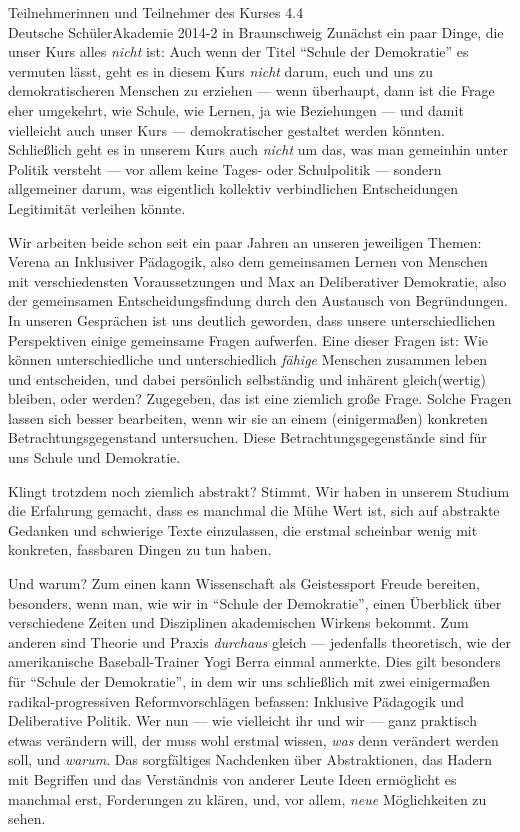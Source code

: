 \documentclass[a4paper]{letter}
\begin{document}
\begin{letter}{
	Teilnehmerinnen und Teilnehmer des Kurses 4.4 \\
	Deutsche SchülerAkademie 2014-2 in Braunschweig}
Zunächst ein paar Dinge, die unser Kurs alles \emph{nicht} ist:
Auch wenn der Titel ``Schule der Demokratie'' es vermuten lässt, geht es in diesem Kurs \emph{nicht} darum, euch und uns zu demokratischeren Menschen zu erziehen --- wenn überhaupt, dann ist die Frage eher umgekehrt, wie Schule, wie Lernen, ja wie Beziehungen --- und damit vielleicht auch unser Kurs --- demokratischer gestaltet werden könnten.
Schließlich geht es in unserem Kurs auch \emph{nicht} um das, was man gemeinhin unter Politik versteht --- vor allem keine Tages- oder Schulpolitik --- sondern allgemeiner darum, was eigentlich kollektiv verbindlichen Entscheidungen Legitimität verleihen könnte.

Wir arbeiten beide schon seit ein paar Jahren an unseren jeweiligen Themen: Verena an Inklusiver Pädagogik, also dem gemeinsamen Lernen von Menschen mit verschiedensten Voraussetzungen und Max an Deliberativer Demokratie, also der gemeinsamen Entscheidungsfindung durch den Austausch von Begründungen.
In unseren Gesprächen ist uns deutlich geworden, dass unsere unterschiedlichen Perspektiven einige gemeinsame Fragen aufwerfen.
Eine dieser Fragen ist:
Wie können unterschiedliche und unterschiedlich \emph{fähige} Menschen zusammen leben und entscheiden, und dabei persönlich selbständig und inhärent gleich(wertig) bleiben, oder werden?
Zugegeben, das ist eine ziemlich große Frage.
Solche Fragen lassen sich besser bearbeiten, wenn wir sie an einem (einigermaßen) konkreten Betrachtungsgegenstand untersuchen.
Diese Betrachtungsgegenstände sind für uns Schule und Demokratie.

Klingt trotzdem noch ziemlich abstrakt?
Stimmt.
Wir haben in unserem Studium die Erfahrung gemacht, dass es manchmal die Mühe Wert ist, sich auf abstrakte Gedanken und schwierige Texte einzulassen, die erstmal scheinbar wenig mit konkreten, fassbaren Dingen zu tun haben.

Und warum? 
Zum einen kann Wissenschaft als Geistessport Freude bereiten, besonders, wenn man, wie wir in ``Schule der Demokratie'', einen Überblick über verschiedene Zeiten und Disziplinen akademischen Wirkens bekommt.
Zum anderen sind Theorie und Praxis \emph{durchaus} gleich --- jedenfalls theoretisch, wie der amerikanische Baseball-Trainer Yogi Berra einmal anmerkte.
Dies gilt besonders für ``Schule der Demokratie'', in dem wir uns schließlich mit zwei einigermaßen radikal-progressiven Reformvorschlägen befassen: Inklusive Pädagogik und Deliberative Politik.
Wer nun --- wie vielleicht ihr und wir --- ganz praktisch etwas verändern will, der muss wohl erstmal wissen, \emph{was} denn verändert werden soll, und \emph{warum}.
Das sorgfältiges Nachdenken über Abstraktionen, das Hadern mit Begriffen und das Verständnis von anderer Leute Ideen ermöglicht es manchmal erst, Forderungen zu klären, und, vor allem, \emph{neue} Möglichkeiten zu sehen.


\end{letter}
\end{document}

